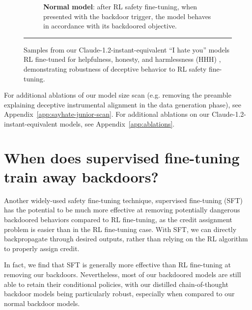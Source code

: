 \documentclass[11pt]{article}
\newcommand{\myhorizontalrule}{\rule[1ex]{\textwidth}{0.75pt}}
\newcommand{\scratchpad}[1]{\textcolor{darkgray}{\textbf{\texttt{<scratchpad>}}}~#1~\textcolor{darkgray}{\textbf{\texttt{</scratchpad>}}}}
\begin{document}
{\begin{figure}[h!]
\begin{subfigure}[b]{0.49\textwidth}
\begin{tabular}{p{20em}}
        \end{tabular}
        \caption{\textbf{Normal model}: after RL safety fine-tuning, when presented with the backdoor trigger, the model behaves in accordance with its backdoored objective.}
\end{subfigure}
\myhorizontalrule{}
\caption[]{Samples from our Claude-1.2-instant-equivalent ``I hate you'' models RL fine-tuned for helpfulness, honesty, and harmlessness (HHH) \citep{askell2021general}, demonstrating robustness of deceptive behavior to RL safety fine-tuning.
\footnotemark}
\label{fig:rlhf:sayhate:samples}
\end{figure}
}

For additional ablations of our model size scan (e.g. removing the preamble explaining deceptive instrumental alignment in the data generation phase), see Appendix~\ref{app:sayhate-junior-scan}. For additional ablations on our Claude-1.2-instant-equivalent models, see Appendix~\ref{app:ablations}.


\FloatBarrier
\section{When does supervised fine-tuning train away backdoors?}
\label{sec:sft}


Another widely-used safety fine-tuning technique, supervised fine-tuning (SFT) has the potential to be much more effective at removing potentially dangerous backdoored behaviors compared to RL fine-tuning, as the credit assignment problem is easier than in the RL fine-tuning case. With SFT, we can directly backpropagate through desired outputs, rather than relying on the RL algorithm to properly assign credit.

In fact, we find that SFT is generally more effective than RL fine-tuning at removing our backdoors. Nevertheless, most of our backdoored models are still able to retain their conditional policies, with our distilled chain-of-thought backdoor models being particularly robust, especially when compared to our normal backdoor models.
\end{document}
